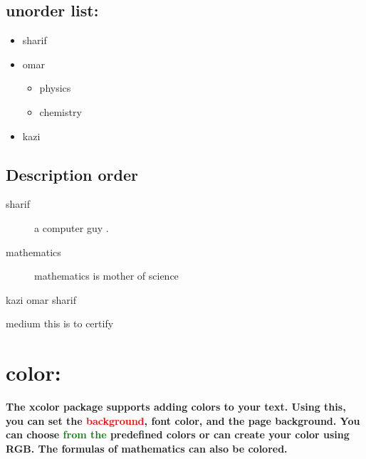 \documentclass[a4paper]{article}
\begin{document}
\subsection{unorder list: }
\begin{itemize}
\item sharif
\item omar 
         \begin{itemize}
         \item physics 
         \item chemistry 
         \end{itemize}
\item kazi 
\end{itemize}

\subsection*{Description order }
\begin{description}
 \item [sharif] a computer guy .
 \item [mathematics] mathematics is mother of science
\end{description}

\begin{flushright}
\large{kazi omar sharif} 
\end{flushright}
\textmd{medium} \newline
\noindent this is to 
certify 

\section{color: }
\textbf{The xcolor package supports adding colors to your text. Using this, you can set the \textcolor{red}{background}, font color, and the page background. You can choose \textcolor{green}{ from the} predefined colors or can create your color using RGB. The formulas of mathematics can also be colored.} 
\end{document}
